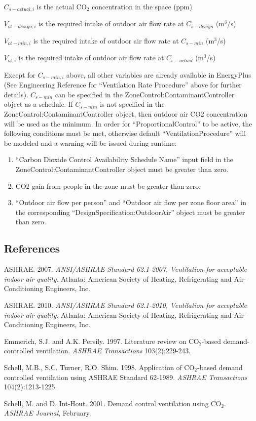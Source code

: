 \({C_{s - actual,i}}\) is the actual CO\(_{2}\) concentration in the space (ppm)

\({V_{ot - design,i}}\) is the required intake of outdoor air flow rate at \({C_{s - design}}\) (m\(^{3}\)/s)

\({V_{ot - min,i}}\) is the required intake of outdoor air flow rate at \({C_{s - min}}\) (m\(^{3}\)/s)

\({V_{ot,i}}\) is the required intake of outdoor air flow rate at \({C_{s - actual}}\) (m\(^{3}\)/s)

Except for \({C_{s - min,i}}\) above, all other variables are already available in EnergyPlus (See Engineering Reference for ``Ventilation Rate Procedure'' above for further details). \({C_{s - min}}\) can be specified in the ZoneControl:ContaminantController object as a schedule. If \({C_{s - min}}\) is not specified in the ZoneControl:ContaminantController object, then outdoor air CO2 concentration will be used as the minimum. In order for ``ProportionalControl'' to be active, the following conditions must be met, otherwise default ``VentilationProcedure'' will be modeled and a warning will be issued during runtime:

\begin{enumerate}
\item ``Carbon Dioxide Control Availability Schedule Name'' input field in the ZoneControl:ContaminantController object must be greater than zero.
\item CO2 gain from people in the zone must be greater than zero.
\item ``Outdoor air flow per person'' and ``Outdoor air flow per zone floor area'' in the corresponding ``DesignSpecification:OutdoorAir'' object must be greater than zero.
\end{enumerate}

\subsection{References}\label{references-018}

ASHRAE. 2007. \emph{ANSI/ASHRAE Standard 62.1-2007, Ventilation for acceptable indoor air quality}. Atlanta: American Society of Heating, Refrigerating and Air-Conditioning Engineers, Inc.

ASHRAE. 2010. \emph{ANSI/ASHRAE Standard 62.1-2010, Ventilation for acceptable indoor air quality}. Atlanta: American Society of Heating, Refrigerating and Air-Conditioning Engineers, Inc.

Emmerich, S.J. and A.K. Persily. 1997. Literature review on CO\(_{2}\)-based demand-controlled ventilation. \emph{ASHRAE Transactions} 103(2):229-243.

Schell, M.B., S.C. Turner, R.O. Shim. 1998. Application of CO\(_{2}\)-based demand controlled ventilation using ASHRAE Standard 62-1989. \emph{ASHRAE Transactions} 104(2):1213-1225.

Schell, M. and D. Int-Hout. 2001. Demand control ventilation using CO\(_{2}\). \emph{ASHRAE Journal}, February.
